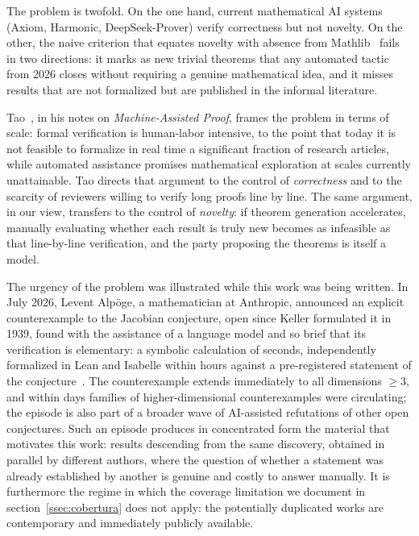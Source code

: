 \documentclass{article}
\theoremstyle{remark}
\begin{document}
The problem is twofold. On the one hand, current mathematical AI systems (Axiom, Harmonic, DeepSeek-Prover) verify correctness but not novelty. On the other, the naive criterion that equates novelty with absence from Mathlib~\cite{kasaura2025} fails in two directions: it marks as new trivial theorems that any automated tactic from 2026 closes without requiring a genuine mathematical idea, and it misses results that are not formalized but are published in the informal literature.

Tao~\cite{tao2025}, in his notes on \textit{Machine-Assisted Proof}, frames the problem in terms of scale: formal verification is human-labor intensive, to the point that today it is not feasible to formalize in real time a significant fraction of research articles, while automated assistance promises mathematical exploration at scales currently unattainable. Tao directs that argument to the control of \emph{correctness} and to the scarcity of reviewers willing to verify long proofs line by line. The same argument, in our view, transfers to the control of \emph{novelty}: if theorem generation accelerates, manually evaluating whether each result is truly new becomes as infeasible as that line-by-line verification, and the party proposing the theorems is itself a model.

The urgency of the problem was illustrated while this work was being written. In July 2026, Levent Alp\"oge, a mathematician at Anthropic, announced an explicit counterexample to the Jacobian conjecture, open since Keller formulated it in 1939, found with the assistance of a language model and so brief that its verification is elementary: a symbolic calculation of seconds, independently formalized in Lean and Isabelle within hours against a pre-registered statement of the conjecture~\cite{alpoge2026}. The counterexample extends immediately to all dimensions $\geq 3$, and within days families of higher-dimensional counterexamples were circulating; the episode is also part of a broader wave of AI-assisted refutations of other open conjectures. Such an episode produces in concentrated form the material that motivates this work: results descending from the same discovery, obtained in parallel by different authors, where the question of whether a statement was already established by another is genuine and costly to answer manually. It is furthermore the regime in which the coverage limitation we document in section~\ref{ssec:cobertura} does not apply: the potentially duplicated works are contemporary and immediately publicly available.
\end{document}
